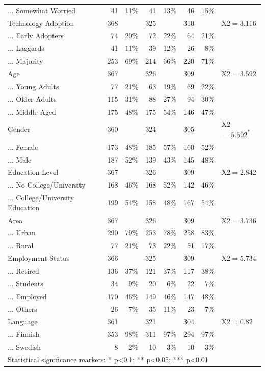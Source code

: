 \begin{table}[!htbp]
{\begin{tabular}{lrrrrrrl}
... Somewhat Worried & 41 & 11\% & 41 & 13\% & 46 & 15\% &  \\ 
Technology Adoption & 368 &  & 325 &  & 310 &  & X2$=3.116^{}$ \\ 
... Early Adopters & 74 & 20\% & 72 & 22\% & 64 & 21\% &  \\ 
... Laggards & 41 & 11\% & 39 & 12\% & 26 & 8\% &  \\ 
... Majority & 253 & 69\% & 214 & 66\% & 220 & 71\% &  \\ 
Age & 367 &  & 326 &  & 309 &  & X2$=3.592^{}$ \\ 
... Young Adults & 77 & 21\% & 63 & 19\% & 69 & 22\% &  \\ 
... Older Adults & 115 & 31\% & 88 & 27\% & 94 & 30\% &  \\ 
... Middle-Aged & 175 & 48\% & 175 & 54\% & 146 & 47\% &  \\ 
Gender & 360 &  & 324 &  & 305 &  & X2$=5.592^{*}$ \\ 
... Female & 173 & 48\% & 185 & 57\% & 160 & 52\% &  \\ 
... Male & 187 & 52\% & 139 & 43\% & 145 & 48\% &  \\ 
Education Level & 367 &  & 326 &  & 309 &  & X2$=2.842^{}$ \\ 
... No College/University & 168 & 46\% & 168 & 52\% & 142 & 46\% &  \\ 
... College/University Education & 199 & 54\% & 158 & 48\% & 167 & 54\% &  \\ 
Area & 367 &  & 326 &  & 309 &  & X2$=3.736^{}$ \\ 
... Urban & 290 & 79\% & 253 & 78\% & 258 & 83\% &  \\ 
... Rural & 77 & 21\% & 73 & 22\% & 51 & 17\% &  \\ 
Employment Status & 366 &  & 325 &  & 309 &  & X2$=5.734^{}$ \\ 
... Retired & 136 & 37\% & 121 & 37\% & 117 & 38\% &  \\ 
... Students & 34 & 9\% & 20 & 6\% & 22 & 7\% &  \\ 
... Employed & 170 & 46\% & 149 & 46\% & 147 & 48\% &  \\ 
... Others & 26 & 7\% & 35 & 11\% & 23 & 7\% &  \\ 
Language & 361 &  & 321 &  & 304 &  & X2$=0.82^{}$ \\ 
... Finnish & 353 & 98\% & 311 & 97\% & 294 & 97\% &  \\ 
... Swedish & 8 & 2\% & 10 & 3\% & 10 & 3\% & \\ 
\hline
\hline
\multicolumn{8}{l}{Statistical significance markers: * p<0.1; ** p<0.05; *** p<0.01}\\ 
\end{tabular}
}
\end{table}



